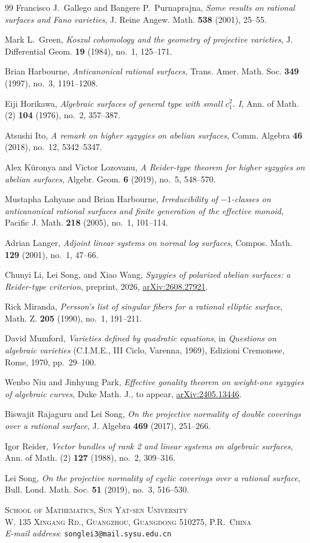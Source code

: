 \documentclass[11pt,reqno]{amsart}
\numberwithin{equation}{section}
\theoremstyle{remark}
\begin{document}
\begin{thebibliography}{99}
Francisco J.~Gallego and Bangere P.~Purnaprajna,
\emph{Some results on rational surfaces and Fano varieties},
J. Reine Angew. Math. \textbf{538} (2001), 25--55.

Mark L.~Green,
\emph{Koszul cohomology and the geometry of projective varieties},
J. Differential Geom. \textbf{19} (1984), no.~1, 125--171.

Brian Harbourne,
\emph{Anticanonical rational surfaces},
Trans. Amer. Math. Soc. \textbf{349} (1997), no.~3, 1191--1208.

Eiji Horikawa,
\emph{Algebraic surfaces of general type with small \(c_1^2\). I},
Ann. of Math. (2) \textbf{104} (1976), no.~2, 357--387.

Atsushi Ito,
\emph{A remark on higher syzygies on abelian surfaces},
Comm. Algebra \textbf{46} (2018), no.~12, 5342--5347.

Alex K{\"u}ronya and Victor Lozovanu,
\emph{A {R}eider-type theorem for higher syzygies on abelian surfaces},
Algebr. Geom. \textbf{6} (2019), no.~5, 548--570.

Mustapha Lahyane and Brian Harbourne,
\emph{Irreducibility of \(-1\)-classes on anticanonical rational surfaces and finite generation of the effective monoid},
Pacific J. Math. \textbf{218} (2005), no.~1, 101--114.

Adrian Langer,
\emph{Adjoint linear systems on normal log surfaces},
Compos. Math. \textbf{129} (2001), no.~1, 47--66.

Chunyi Li, Lei Song, and Xiao Wang,
\emph{Syzygies of polarized abelian surfaces: a Reider-type criterion},
preprint, 2026, \href{https://arxiv.org/abs/2608.27921}{arXiv:2608.27921}.

Rick Miranda,
\emph{Persson's list of singular fibers for a rational elliptic surface},
Math. Z. \textbf{205} (1990), no.~1, 191--211.

David Mumford,
\emph{Varieties defined by quadratic equations},
in \emph{Questions on algebraic varieties}
(C.I.M.E., III Ciclo, Varenna, 1969),
Edizioni Cremonese, Rome, 1970, pp.~29--100.

Wenbo Niu and Jinhyung Park,
\emph{Effective gonality theorem on weight-one syzygies of algebraic curves},
Duke Math. J., to appear,
\href{https://arxiv.org/abs/2405.13446}{arXiv:2405.13446}.

Biswajit Rajaguru and Lei Song,
\emph{On the projective normality of double coverings over a rational surface},
J. Algebra \textbf{469} (2017), 251--266.

Igor Reider,
\emph{Vector bundles of rank 2 and linear systems on algebraic surfaces},
Ann. of Math. (2) \textbf{127} (1988), no.~2, 309--316.

Lei Song,
\emph{On the projective normality of cyclic coverings over a rational surface},
Bull. Lond. Math. Soc. \textbf{51} (2019), no.~3, 516--530.


\end{thebibliography}

{\small\noindent\textsc{School of Mathematics, Sun Yat-sen University\\
W. 135 Xingang Rd., Guangzhou, Guangdong 510275, P.R.~China}\\
\emph{E-mail address}: \texttt{songlei3@mail.sysu.edu.cn}\par}
\end{document}
